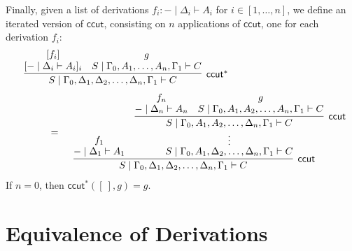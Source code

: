 \documentclass[sn-mathphys-num]{sn-jnl}%
\newcommand{\GG}{\Gamma}
\newcommand{\GD}{\Delta}
\newcommand{\vd}{\vdash}
\newcommand{\proofbox}[1]{\begin{tabular}{l} #1 \end{tabular}}
\newcommand{\mf}[1]{\mathsf{#1}}
\theoremstyle{thmstyleone}%
\theoremstyle{thmstyletwo}%
\theoremstyle{thmstylethree}%
\newtheorem{definition}[theorem]{Definition}%
\begin{document}
Finally, given a list of derivations $f_i : {-} \mid \GD_i \vd A_i$ for $i \in [1,\dots , n]$, we define an iterated version of $\mathsf{ccut}$, consisting on $n$ applications of $\mathsf{ccut}$, one for each derivation $f_i$:
\begin{equation}\label{ccut*}
  \begin{array}{l}
    \proofbox{\infer[\mathsf{ccut}^*]{S \mid \GG_0,\GD_1,\GD_2,\dots,\GD_n,\GG_1 \vd C}{
    \deduce{[ {-} \mid \GD_i \vd A_i]_i}{[f_i]}
    &
    \deduce{S \mid \GG_0,A_1,\dots,A_n,\GG_1 \vd C}{g}
    }}
    \\[20pt]
    \qquad \qquad =
    \proofbox{
    \infer[\mathsf{ccut}]{S \mid \GG_0,\GD_1,\GD_2,\dots,\GD_n,\GG_1 \vd C}{
    \deduce{{-} \mid \GD_1 \vd A_1}{f_1}
    &
    \deduce[\vdots]{S \mid \GG_0,A_1,\GD_2,\dots,\GD_n,\GG_1 \vd C}{
    \infer[\mathsf{ccut}]{S \mid \GG_0,A_1,A_2,\dots,\GD_n,\GG_1 \vd C}{
    \deduce{{-} \mid \GD_n \vd A_n}{f_n}
    &
    \deduce{S \mid \GG_0, A_1, A_2,\dots,A_n, \GG_1 \vd C}{g}
    }
    }
    }
    }
  \end{array}
\end{equation}
If $n=0$, then $\mathsf{ccut}^* ([\ ],g) = g$.



\section{Equivalence of Derivations}\label{sec:equiv}
\end{document}

